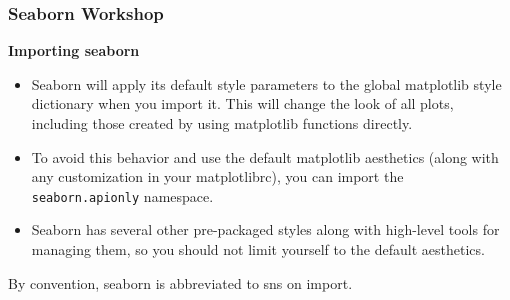 \documentclass{beamer}
\begin{document}
\begin{frame}
\frametitle{Seaborn Workshop}
\large

\noindent \textbf{Importing seaborn}
\begin{itemize}
\item	Seaborn will apply its default style parameters to the global matplotlib style dictionary when you import it. This will change the look of all plots, including those created by using matplotlib functions directly. 
\item To avoid this behavior and use the default matplotlib aesthetics (along with any customization in your matplotlibrc), you can import the \texttt{seaborn.apionly} namespace.
	
\item Seaborn has several other pre-packaged styles along with high-level tools for managing them, so you should not limit yourself to the default aesthetics.
	
\end{itemize}

By convention, seaborn is abbreviated to sns on import.
\end{frame}
\end{document}
